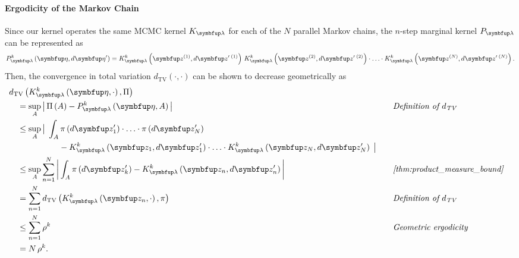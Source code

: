\begin{proofEnd}
  \paragraph{Ergodicity of the Markov Chain}
  Since our kernel operates the same MCMC kernel \(K_{\vlambda}\) for each of the \(N\) parallel Markov chains, the \(n\)-step marginal kernel \(P_{\vlambda}\) can be represented as
  \begin{align*}
    P_{\vlambda}^k\left(\veta, d\veta^{\prime}\right)
    = 
    K_{\vlambda}^k\left(\vz^{(1)}, d\vz^{\prime\; (1)}\right)
    \,
    K_{\vlambda}^k\left(\vz^{(2)}, d\vz^{\prime\; (2)}\right)
    \cdot
    \ldots 
    \cdot
    K_{\vlambda}^k\left(\vz^{(N)}, d\vz^{\prime\; (N)}\right).
  \end{align*}
  Then, the convergence in total variation \(d_{\mathrm{TV}}\left(\cdot, \cdot\right)\) can be shown to decrease geometrically as
  \begin{alignat}{2}
    &\DTV{K^{k}_{\vlambda}\left(\veta, \cdot\right)}{\Pi}
    \nonumber
    \\
    &\quad=
    \sup_{A}
    \abs{
      \Pi\left(A\right)
      -
      P^{k}_{\vlambda}\left(\veta, A\right)
    }
    &&\quad\text{\textit{Definition of \(d_{\text{TV}}\)}}
    \nonumber
    \\
    &\quad\leq
    \sup_{A}
    \big|\;
    \int_{A}
      \pi\left(d\vz^{\prime}_1\right) \cdot \ldots \cdot \pi\left(d\vz^{\prime}_N\right)
    \nonumber
      \\
      &\qquad\qquad\qquad-
      K^k_{\vlambda}\left(\vz_1, d\vz^{\prime}_1\right) \cdot \ldots \cdot K^k_{\vlambda}\left(\vz_N, d\vz^{\prime}_N\right)
    \;\big|
    \nonumber
    \\
    &\quad\leq
    \sup_{A}
    \sum_{n=1}^N
    \abs{
    \int_{A}
      \pi\left(d\vz^{\prime}_k\right) - K^{k}_{\vlambda}\left(\vz_n, d\vz^{\prime}_n\right) 
    }
    &&\quad\text{\textit{\cref{thm:product_measure_bound}}}
    \nonumber
    \\
    &\quad=
    \sum_{n=1}^N
    \DTV{K^k_{\vlambda}\left(\vz_n, \cdot\right)}{\pi}
    &&\quad\text{\textit{Definition of \(d_{\text{TV}}\)}}
    \nonumber
    \\
    &\quad\leq
    \sum_{n=1}^N
    \rho^{k}
    &&\quad\text{\textit{Geometric ergodicity}}
    \nonumber
    \\
    &\quad=
    N\,\rho^{k}.
    \nonumber
  \end{alignat}


\end{proofEnd}
